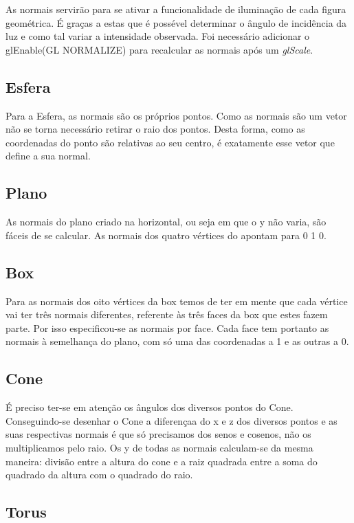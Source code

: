 As normais servirão para se ativar a funcionalidade de iluminação de cada figura geométrica. É graças a estas que é possével determinar o ângulo de incidência da luz e como tal variar a intensidade observada.
Foi necessário adicionar o glEnable(GL NORMALIZE) para recalcular as normais após um \textit{glScale}.


\subsection{Esfera}


Para a Esfera, as normais são os próprios pontos. Como as normais são um vetor não se torna necessário retirar o raio dos pontos. Desta forma, como as coordenadas do ponto são relativas ao seu centro, é exatamente esse vetor que define a sua normal.

\subsection{Plano}
As normais do plano criado na horizontal, ou seja em que o y não varia,
são fáceis de se calcular. As normais dos quatro vértices do apontam para 0 1 0.

\subsection{Box}
Para as normais dos oito vértices da box temos de ter em mente que cada vértice vai ter três normais diferentes, referente às três faces da box que estes fazem parte. Por isso especificou-se as normais por face. Cada face tem portanto as normais à semelhança do plano, com só uma das coordenadas a 1 e as outras a 0.

\subsection{Cone}
É preciso ter-se em atenção os ângulos dos diversos pontos do Cone.
Conseguindo-se desenhar o Cone a diferençaa do x e z dos diversos pontos e as suas respectivas normais é  que só precisamos dos senos e cosenos, não os multiplicamos pelo raio. Os y de todas as normais calculam-se da mesma maneira: divisão entre a altura do cone e a raiz quadrada entre a soma do quadrado da altura com o quadrado do raio.


\subsection{Torus}

